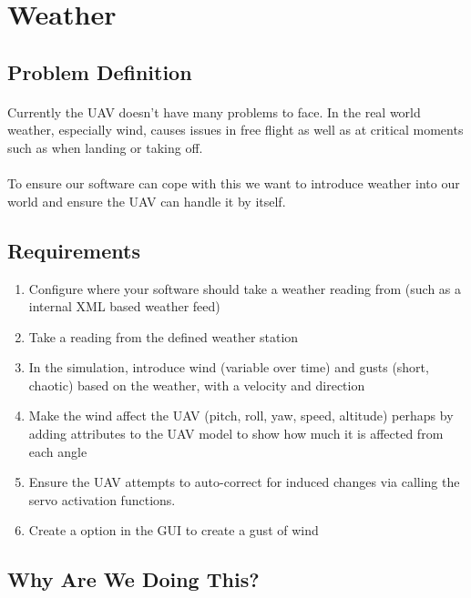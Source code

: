 \documentclass[11pt]{book}
\begin{document}
\clearpage



\section{Weather}

\subsection{Problem Definition}

\paragraph{} Currently the UAV doesn't have many problems to face. In the real world weather, especially wind, causes issues in free flight as well as at critical moments such as when landing or taking off.

\paragraph{} To ensure our software can cope with this we want to introduce weather into our world and ensure the UAV can handle it by itself.

\subsection{Requirements}

\begin{enumerate}
\item{} Configure where your software should take a weather reading from (such as a internal XML based weather feed)
\item{} Take a reading from the defined weather station
\item{} In the simulation, introduce wind (variable over time) and gusts (short, chaotic) based on the weather, with a velocity and direction
\item{} Make the wind affect the UAV (pitch, roll, yaw, speed, altitude) perhaps by adding attributes to the UAV model to show how much it is affected from each angle
\item{} Ensure the UAV attempts to auto-correct for induced changes via calling the servo activation functions.
\item{} Create a option in the GUI to create a gust of wind
\end{enumerate}

\subsection{Why Are We Doing This?}
\end{document}
